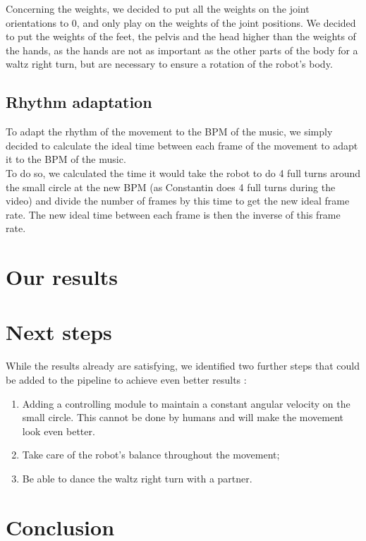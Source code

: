 \documentclass{amsart}
\theoremstyle{definition}
\theoremstyle{plain}
\begin{document}
Concerning the weights, we decided to put all the weights on the joint orientations to 0, and only play on the weights of the joint positions. We decided to put the weights of the feet, the pelvis and the head higher than the weights of the hands, as the hands are not as important as the other parts of the body for a waltz right turn, but are necessary to ensure a rotation of the robot's body.

\subsection{Rhythm adaptation}

To adapt the rhythm of the movement to the BPM of the music, we simply decided to calculate the ideal time between each frame of the movement to adapt it to the BPM of the music. \\

To do so, we calculated the time it would take the robot to do 4 full turns around the small circle at the new BPM (as Constantin does 4 full turns during the video) and divide the number of frames by this time to get the new ideal frame rate. The new ideal time between each frame is then the inverse of this frame rate.

\section{Our results}


\section{Next steps}


While the results already are satisfying, we identified two further steps that could be added to the pipeline to achieve even better results :
\begin{enumerate}
    \item Adding a controlling module to maintain a constant angular velocity on the small circle. This cannot be done by humans and will make the movement look even better.
    \item Take care of the robot's balance throughout the movement;
    \item Be able to dance the waltz right turn with a partner.
\end{enumerate}

\section{Conclusion}


\printbibliography[]
\end{document}
